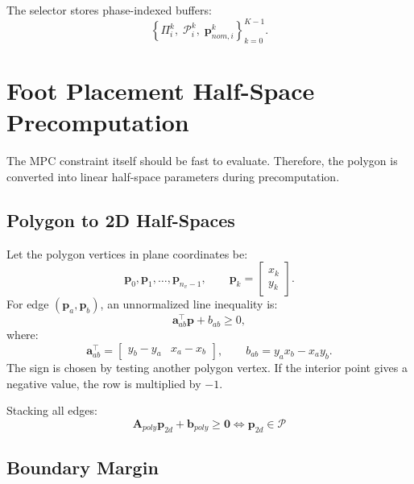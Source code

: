 \documentclass[11pt,a4paper]{article}
\begin{document}
The selector stores phase-indexed buffers:
\begin{equation}
	\left\{
		\Pi_i^k,\;
		\mathcal{P}_i^k,\;
		\bm{p}_{nom,i}^k
	\right\}_{k=0}^{K-1}.
\end{equation}


\section{Foot Placement Half-Space Precomputation}
\label{sec:foot_placement_precomp}

The MPC constraint itself should be fast to evaluate. Therefore, the polygon is converted into linear half-space parameters during precomputation.

\subsection{Polygon to 2D Half-Spaces}

Let the polygon vertices in plane coordinates be:
\begin{equation}
	\bm{p}_0,\bm{p}_1,\ldots,\bm{p}_{n_v-1},
	\qquad
	\bm{p}_k =
	\begin{bmatrix}
		x_k\\y_k
	\end{bmatrix}.
\end{equation}
For edge $(\bm{p}_a,\bm{p}_b)$, an unnormalized line inequality is:
\begin{equation}
	\bm{a}_{ab}^{\top}\bm{p}+b_{ab}\geq 0,
\end{equation}
where:
\begin{equation}
	\bm{a}_{ab}^{\top}
	=
	\begin{bmatrix}
		y_b-y_a & x_a-x_b
	\end{bmatrix},
	\qquad
	b_{ab}
	=
	y_a x_b - x_a y_b.
\end{equation}
The sign is chosen by testing another polygon vertex. If the interior point gives a negative value, the row is multiplied by $-1$.

Stacking all edges:
\begin{equation}
	\boxed{
		\bm{A}_{poly}\bm{p}_{2d}+\bm{b}_{poly}\geq \bm{0}
		\iff
		\bm{p}_{2d}\in\mathcal{P}
	}
\end{equation}

\subsection{Boundary Margin}
\end{document}
